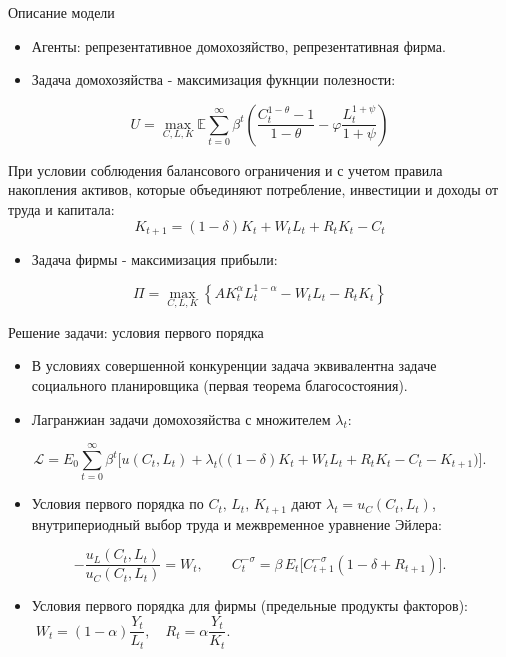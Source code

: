 \documentclass[
aspectratio=169,	%
LEEC,				%
portuguese,			%
]{DEEclassP}
\begin{document}
\begin{frame}{Описание модели}
    \scriptsize

    \begin{itemize}
        \item Агенты: репрезентативное домохозяйство, репрезентативная фирма.
        \item Задача домохозяйства - максимизация фукнции полезности:
    \end{itemize}

    \[
    U = \max_{C,L,K}
    \mathbb{E} \sum_{t=0}^{\infty}\beta^t
    \left(
    \frac{C_t^{1-\theta}-1}{1-\theta}-\varphi \frac{L_t^{1+\psi}}{1+\psi}
    \right)
    \]

    При условии соблюдения балансового ограничения и с учетом правила накопления активов, которые объединяют потребление, инвестиции и доходы от труда и капитала:
    \[
    K_{t+1}=(1-\delta)K_t + W_tL_t+R_tK_t - C_t
    \]

    \begin{itemize}
        \item Задача фирмы - максимизация прибыли:
    \end{itemize}
    \[
        \Pi = \max_{C,L,K} \left\{AK_t^{\alpha}L_t^{1-\alpha} - W_tL_t - R_tK_t\right\}
    \]
\end{frame}

\begin{frame}{Решение задачи: условия первого порядка}
\scriptsize
\begin{itemize}
    \item В условиях совершенной конкуренции задача эквивалентна задаче социального планировщика (первая теорема благосостояния).
    \item Лагранжиан задачи домохозяйства с множителем $\lambda_t$:
\end{itemize}
\[
\mathcal{L}=E_0\sum_{t=0}^{\infty}\beta^t\Big[u(C_t,L_t)+\lambda_t\big((1-\delta)K_t+W_tL_t+R_tK_t-C_t-K_{t+1}\big)\Big].
\]
\begin{itemize}
    \item Условия первого порядка по $C_t,\,L_t,\,K_{t+1}$ дают $\lambda_t=u_C(C_t,L_t)$, внутрипериодный выбор труда и межвременное уравнение Эйлера:
\end{itemize}
\[
-\frac{u_L(C_t,L_t)}{u_C(C_t,L_t)}=W_t,
\qquad
C_t^{-\sigma}=\beta\,E_t\big[C_{t+1}^{-\sigma}(1-\delta+R_{t+1})\big].
\]
\begin{itemize}
    \item Условия первого порядка для фирмы (предельные продукты факторов):
    \(\; W_t=(1-\alpha)\dfrac{Y_t}{L_t},\quad R_t=\alpha\dfrac{Y_t}{K_t}.\)
\end{itemize}
\end{frame}
\end{document}

